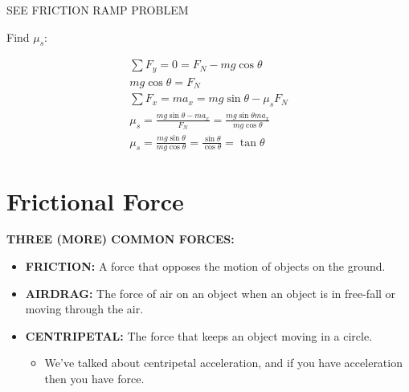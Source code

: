 \begin{problem}
	SEE FRICTION RAMP PROBLEM

	Find $\mu_s$:

	$$
		\begin{aligned}
			\sum F_y = 0 = F_N - mg\cos\theta\\
			mg\cos\theta = F_N\\
			\sum F_x = ma_x = mg\sin\theta - \mu_sF_N\\
			\mu_s = \frac{mg\sin\theta - ma_x}{F_N} = \frac{mg\sin\theta ma_x}{mg\cos\theta}\\
			\mu_s = \frac{mg\sin\theta}{mg\cos\theta} = \frac{\sin\theta}{\cos\theta}=\tan\theta
		\end{aligned}
	$$
\end{problem}


\section{Frictional Force}

\textbf{THREE (MORE) COMMON FORCES:}
\begin{itemize}
	\item \textbf{FRICTION:} A force that opposes the motion of objects on the ground.
	\item \textbf{AIRDRAG:} The force of air on an object when an object is in free-fall or moving through the air.
	\item \textbf{CENTRIPETAL:} The force that keeps an object moving in a circle.
	\begin{itemize}
		\item We've talked about centripetal acceleration, and if you have acceleration then you have force.
	\end{itemize}
\end{itemize}
	
